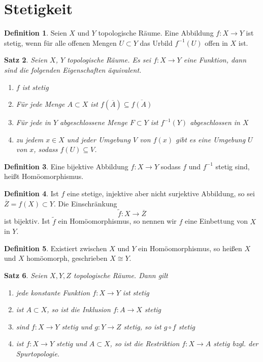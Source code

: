 \documentclass[a4paper, 12pt]{article}
\theoremstyle{plain}
\newtheorem{theorem}{Satz}[section] %
\theoremstyle{definition}
\newtheorem{definition}[theorem]{Definition} %
\theoremstyle{lemma}
\theoremstyle{remark}
\theoremstyle{corollary}
\theoremstyle{example}
\begin{document}
	\section{Stetigkeit}
	\begin{definition}
		Seien $X$ und $Y$ topologische Räume. Eine Abbildung $f:X \to Y$ ist stetig, wenn für alle offenen Mengen $U \subset Y$ das Urbild $f^{-1}(U)$ offen in $X$ ist.
	\end{definition}
	\begin{theorem}
		Seien $X$, $Y$ topologische Räume. Es sei $f:X \to Y$ eine Funktion, dann sind die folgenden Eigenschaften äquivalent. \begin{enumerate}
			\item $f$ ist stetig
			\item Für jede Menge $A \subset X$ ist $f(\overline{A}) \subseteq \overline{f(A)}$
			\item Für jede in $Y$ abgeschlossene Menge $F \subset Y$ ist $f^{-1}(Y)$ abgeschlossen in $X$
			\item zu jedem $x \in X$ und jeder Umgebung $V$ von $f(x)$ gibt es eine Umgebung $U$ von $x$, sodass $f(U) \subseteq V$.
		\end{enumerate}
	\end{theorem}
	\begin{definition}
		Eine bijektive Abbildung $f:X\to Y$ sodass $f$ und $f^{-1}$ stetig sind, heißt Homöomorphismus.
	\end{definition}
	\begin{definition}
		Ist $f$ eine stetige, injektive aber nicht surjektive Abbildung, so sei $\overline{Z} = f(X) \subset Y$. Die Einschränkung \[\tilde{f}: X \to \overline{Z}\] ist bijektiv. Ist $\tilde{f}$ ein Homöomorphismus, so nennen wir $f$ eine Einbettung von $X$ in $Y$.
	\end{definition}
	\begin{definition}
		Existiert zwischen $X$ und $Y$ ein Homöomorphismus, so heißen $X$ und $X$ homöomorph, geschrieben $X \cong Y$.
	\end{definition}
	\begin{theorem}
		Seien $X,Y,Z$ topologische Räume. Dann gilt \begin{enumerate}
			\item jede konstante Funktion $f:X\to Y$ ist stetig
			\item ist $A\subset X$, so ist die Inklusion $f: A \to X$ stetig
			\item sind $f:X\to Y$ stetig und $g:Y \to Z$ stetig, so ist $g\circ f$ stetig
			\item ist $f:X\to Y$ stetig und $A\subset X$, so ist die Restriktion $f:X \to A$ stetig bzgl. der Spurtopologie.
		\end{enumerate}
	\end{theorem}
\end{document}

